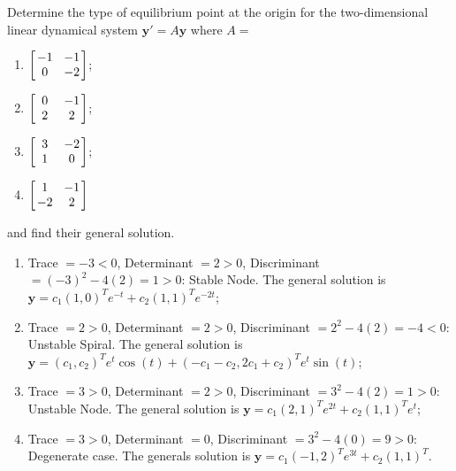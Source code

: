 \begin{Exercise}
Determine the type of equilibrium point at the origin for the two-dimensional linear dynamical system $\textbf{y}' = A\textbf{y}$ where $A =$
\begin{enumerate}[label=(\alph*)]
    \item $\left[\begin{array}{@{\,}wc{12pt}wc{12pt}@{\,}}
    -1&-1\\ 
    0&-2
    \end{array}\right]$;
    \item $\left[\begin{array}{@{\,}wc{12pt}wc{12pt}@{\,}}
    0&-1\\ 
    2&2
    \end{array}\right]$;
    \item $\left[\begin{array}{@{\,}wc{12pt}wc{12pt}@{\,}}
    3&-2\\ 
    1&0
    \end{array}\right]$;
    \item $\left[\begin{array}{@{\,}wc{12pt}wc{12pt}@{\,}}
    1&-1\\ 
    -2&2
    \end{array}\right]$
\end{enumerate}
and find their general solution.
\end{Exercise}
\begin{Answer}
\begin{enumerate}[label=(\alph*)]
    \item Trace $= -3 < 0$, Determinant $= 2 > 0$, Discriminant $= (-3)^2 - 4(2) = 1 > 0$: Stable Node. The general solution is $\textbf{y} = c_1(1,0)^Te^{-t} + c_2(1,1)^Te^{-2t}$;
    \item Trace $= 2 > 0$, Determinant $= 2 > 0$, Discriminant $= 2^2 - 4(2) = -4 < 0$: Unstable Spiral. The general solution is $\textbf{y} = (c_1,c_2)^Te^t\cos(t) + (-c_1-c_2,2c_1+c_2)^Te^t\sin(t)$;
    \item Trace $= 3 > 0$, Determinant $= 2 > 0$, Discriminant $= 3^2 - 4(2) = 1 > 0$: Unstable Node. The general solution is $\textbf{y} = c_1(2,1)^Te^{2t} + c_2(1,1)^Te^{t}$;
    \item Trace $= 3 > 0$, Determinant $= 0$, Discriminant $= 3^2 - 4(0) = 9 > 0$: Degenerate case. The generals solution is $\textbf{y} = c_1(-1,2)^Te^{3t} + c_2(1,1)^T$.
\end{enumerate}
\end{Answer}

